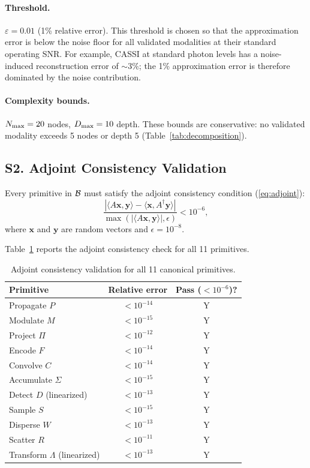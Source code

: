 \paragraph{Threshold.}
$\varepsilon = 0.01$ (1\% relative error). This threshold is chosen so that the approximation error is below the noise floor for all validated modalities at their standard operating SNR. For example, CASSI at standard photon levels has a noise-induced reconstruction error of ${\sim}3\%$; the 1\% approximation error is therefore dominated by the noise contribution.

\paragraph{Complexity bounds.}
$N_{\max} = 20$ nodes, $D_{\max} = 10$ depth. These bounds are conservative: no validated modality exceeds 5 nodes or depth 5 (Table~\ref{tab:decomposition}).


\subsection*{S2. Adjoint Consistency Validation}
\label{sec:supp_adjoint}

Every primitive in $\mathcal{B}$ must satisfy the adjoint consistency condition (\cref{eq:adjoint}):
\begin{equation}
  \frac{|\langle A\mathbf{x}, \mathbf{y} \rangle - \langle \mathbf{x}, A^\dagger \mathbf{y} \rangle|}
       {\max(|\langle A\mathbf{x}, \mathbf{y} \rangle|, \epsilon)} < 10^{-6},
  \label{eq:supp_adjoint_check}
\end{equation}
where $\mathbf{x}$ and $\mathbf{y}$ are random vectors and $\epsilon = 10^{-8}$.

Table~\ref{tab:supp_adjoint} reports the adjoint consistency check for all 11 primitives.

\begin{table}[htbp]
\centering
\caption{Adjoint consistency validation for all 11 canonical primitives.} \label{tab:supp_adjoint}
\begin{tabular}{l c c}
\toprule
\textbf{Primitive} & \textbf{Relative error} & \textbf{Pass ($< 10^{-6}$)?} \\
\midrule
Propagate $P$   & $< 10^{-14}$ & Y \\
Modulate $M$    & $< 10^{-15}$ & Y \\
Project $\Pi$   & $< 10^{-12}$ & Y \\
Encode $F$      & $< 10^{-14}$ & Y \\
Convolve $C$    & $< 10^{-14}$ & Y \\
Accumulate $\Sigma$ & $< 10^{-15}$ & Y \\
Detect $D$ (linearized) & $< 10^{-13}$ & Y \\
Sample $S$      & $< 10^{-15}$ & Y \\
Disperse $W$    & $< 10^{-13}$ & Y \\
Scatter $R$     & $< 10^{-11}$ & Y \\
Transform $\Lambda$ (linearized) & $< 10^{-13}$ & Y \\
\bottomrule
\end{tabular}
\end{table}

